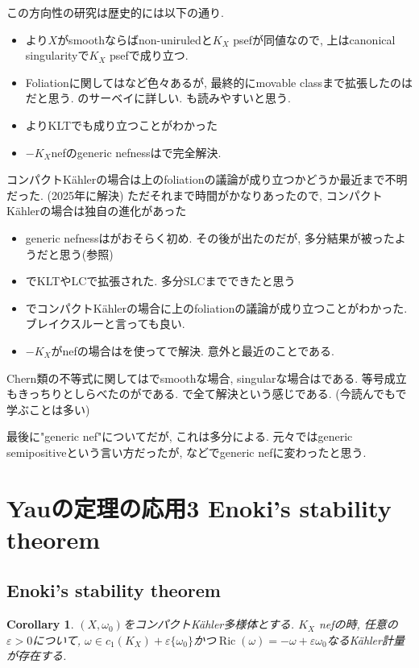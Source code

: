 \documentclass[dvipdfmx,a4paper,11pt]{article} %
\newtheorem{cor}[thm]{Corollary}
\theoremstyle{definition}
\theoremstyle{remark}
\numberwithin{equation}{section}
\DeclareMathOperator{\Ric}{Ric}
\begin{document}
この方向性の研究は歴史的には以下の通り.
\begin{itemize}
\item \cite{BDPP13}より$X$がsmoothならばnon-uniruledと$K_X$ psefが同値なので, 上はcanonical singularityで$K_X$ psefで成り立つ. 
\item Foliationに関しては\cite{BM16, KST07}など色々あるが, 最終的にmovable classまで拡張したのは\cite{CP19}だと思う. \cite{Cla16}のサーベイに詳しい. \cite{Lazicnote}も読みやすいと思う. 
\item \cite{CKT21}よりKLTでも成り立つことがわかった
\item $-K_X$nefのgeneric nefnessは\cite{Ou23}で完全解決. 
\end{itemize}

 コンパクトK\"ahlerの場合は上のfoliationの議論が成り立つかどうか最近まで不明だった. (2025年に解決) ただそれまで時間がかなりあったので, コンパクトK\"ahlerの場合は独自の進化があった
\begin{itemize}
\item generic nefnessは\cite{Eno88}がおそらく初め. その後\cite{Cao13}が出たのだが, 多分結果が被ったようだと思う(\cite[Remark 2]{Cao13}参照)
\item \cite{Gue16}でKLTやLCで拡張された. 多分SLCまでできたと思う
\item  \cite{Ou25}でコンパクトK\"ahlerの場合に上のfoliationの議論が成り立つことがわかった. ブレイクスルーと言っても良い. 
\item $-K_X$がnefの場合は\cite{Ou25}を使って\cite{IJZ25, MWWZ25, FGSW26}で解決. 意外と最近のことである. 
\end{itemize}

Chern類の不等式に関しては\cite{Miy87, Cao13, Ou23, IM22}でsmoothな場合, singularな場合は\cite{IMM24}である.
等号成立もきっちりとしらべたのが\cite{Cao13, Ou23, IM22, IMM24}である. \cite{IMM24}で全て解決という感じである. (今読んでも\cite{Miy87, Cao13, Ou23}で学ぶことは多い)

最後に"generic nef"についてだが, これは多分\cite{Pet12}による. 元々\cite{Miy87,Eno88}ではgeneric semipositiveという言い方だったが, \cite{Ou23}などでgeneric nefに変わったと思う. 

 
 \newpage
  \section{Yauの定理の応用3 Enoki's  stability theorem}
 
 \subsection{Enoki's stability theorem}
\begin{cor}
\label{cor-Yau-thm-3}
$(X, \omega_0)$をコンパクトK\"ahler多様体とする. 
$K_X$ nefの時, 任意の$\varepsilon>0$について, $\omega \in c_1(K_X) + \varepsilon\{\omega_0\}$かつ$\Ric(\omega) = -\omega + \varepsilon \omega_0$なるK\"ahler計量が存在する. 
\end{cor}
\end{document}
